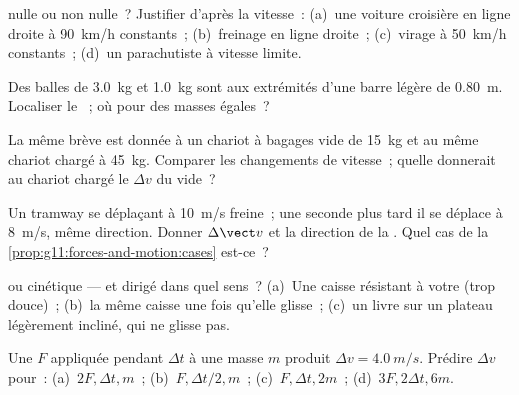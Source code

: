 \begin{exercise}[$\star$]\label{exo:g11:forces-and-motion:1}
 nulle ou non nulle~?
Justifier d'après la vitesse~: (a)~une voiture croisière en ligne
droite à \qty{90}{km/h} constants~; (b)~freinage en ligne droite~;
(c)~virage à \qty{50}{km/h} constants~; (d)~un parachutiste à vitesse
limite.
\end{exercise}

\begin{exercise}[$\star$]\label{exo:g11:forces-and-motion:2}
Des balles de \qty{3.0}{kg} et \qty{1.0}{kg} sont aux extrémités d'une
barre légère de \qty{0.80}{m}. Localiser le
~; où pour des masses
égales~?
\end{exercise}

\begin{exercise}[$\star$]\label{exo:g11:forces-and-motion:3}
La même  brève est donnée à un chariot à bagages vide de
\qty{15}{kg} et au même chariot chargé à \qty{45}{kg}. Comparer les
changements de vitesse~; quelle  donnerait au chariot chargé le
$\Delta v$ du vide~?
\end{exercise}

\begin{exercise}[$\star$]\label{exo:g11:forces-and-motion:4}
Un tramway se déplaçant à \qty{10}{m/s} freine~; une seconde plus tard
il se déplace à \qty{8}{m/s}, même direction. Donner $\Delta \vect v$
et la direction de la
. Quel cas de la
\cref{prop:g11:forces-and-motion:cases} est-ce~?
\end{exercise}

\begin{exercise}[$\star$]\label{exo:g11:forces-and-motion:5}
 ou
cinétique --- et dirigé dans quel
sens~? (a)~Une caisse résistant à votre  (trop douce)~; (b)~la
même caisse une fois qu'elle glisse~; (c)~un livre sur un plateau
légèrement incliné, qui ne glisse pas.
\end{exercise}

\begin{exercise}[$\star\star$]\label{exo:g11:forces-and-motion:6}
Une  $F$ appliquée
pendant $\Delta t$ à une masse $m$ produit $\Delta v = \qty{4.0}{m/s}$.
Prédire $\Delta v$ pour~: (a)~$2F, \Delta t, m$~; (b)~$F, \Delta t/2,
m$~; (c)~$F, \Delta t, 2m$~; (d)~$3F, 2\Delta t, 6m$.
\end{exercise}

